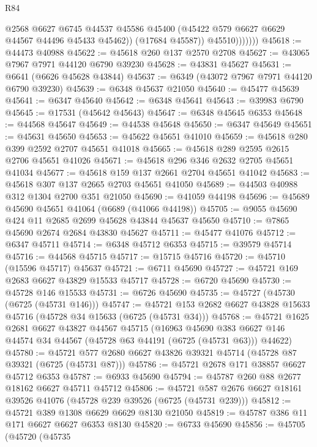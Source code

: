\begin{lexlean}{R84}
\begin{coremodule}
                      @2568
                      @6627
                      @6745
                      @44537
                      @45586
                      @45400
                      (@45422 @579 @6627 @6629 @44567 @44496 @45433 @45462))
                    (@17684 @45587))
                  @45510)))))))
@45618 := @44473 @40988
@45622 := @45618 @260 @137 @2570 @2708
@45627 := @43065 @7967 @7971 @44120 @6790 @39230
@45628 := @43831 @45627
@45631 := @6641 (@6626 @45628 @43844)
@45637 := @6349 (@43072 @7967 @7971 @44120 @6790 @39230)
@45639 := @6348 @45637 @21050
@45640 := @45477 @45639
@45641 := @6347 @45640
@45642 := @6348 @45641
@45643 := @39983 @6790
@45645 := @17531 (@45642 @45643)
@45647 := @6348 @45645 @6353
@45648 := @44568 @45647
@45649 := @44538 @45648
@45650 := @6347 @45649
@45651 := @45631 @45650
@45653 := @45622 @45651 @41010
@45659 := @45618 @280 @399 @2592 @2707 @45651 @41018
@45665 := @45618 @289 @2595 @2615 @2706 @45651 @41026
@45671 := @45618 @296 @346 @2632 @2705 @45651 @41034
@45677 := @45618 @159 @137 @2661 @2704 @45651 @41042
@45683 := @45618 @307 @137 @2665 @2703 @45651 @41050
@45689 := @44503 @40988 @312 @1304 @2700 @351 @21050
@45690 := @41059 @44198
@45696 := @45689 @45690 @45651 @41064 (@6689 (@41066 @44198))
@45705 := @9055 @45690 @424 @11 @2685 @2699 @45628 @43844 @45637 @45650
@45710 := @7865 @45690 @2674 @2684 @43830 @45627
@45711 := @45477 @41076
@45712 := @6347 @45711
@45714 := @6348 @45712 @6353
@45715 := @39579 @45714
@45716 := @44568 @45715
@45717 := @15715 @45716
@45720 := @45710 (@15596 @45717) @45637
@45721 := @6711 @45690
@45727 := @45721 @169 @2683 @6627 @43829 @15533 @45717
@45728 := @6720 @45690
@45730 := @45728 @146 @15533
@45731 := @6726 @45690
@45735 := @45727 (@45730 (@6725 (@45731 @146)))
@45747 := @45721 @153 @2682 @6627 @43828 @15633 @45716 (@45728 @34 @15633 (@6725 (@45731 @34)))
@45768 := @45721
    @1625
    @2681
    @6627
    @43827
    @44567
    @45715
    (@16963
      @45690
      @383
      @6627
      @146
      @44574
      @34
      @44567
      (@45728 @63 @44191 (@6725 (@45731 @63)))
      @44622)
@45780 := @45721 @577 @2680 @6627 @43826 @39321 @45714 (@45728 @87 @39321 (@6725 (@45731 @87)))
@45786 := @45721 @2678 @171 @38857 @6627 @45712 @6353
@45787 := @6933 @45690
@45794 := @45787 @260 @88 @2677 @18162 @6627 @45711 @45712
@45806 := @45721 @587 @2676 @6627 @18161 @39526 @41076 (@45728 @239 @39526 (@6725 (@45731 @239)))
@45812 := @45721 @389 @1308 @6629 @6629 @8130 @21050
@45819 := @45787 @386 @11 @171 @6627 @6627 @6353 @8130
@45820 := @6733 @45690
@45856 := @45705
    (@45720
      (@45735

\end{coremodule}
\end{lexlean}
